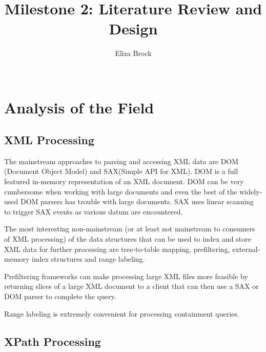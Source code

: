 \documentclass{acm_proc_article-sp}
\begin{document}
\title{Milestone 2: Literature Review and Design}


\author{
\alignauthor 
Eliza Brock \\
       \\
}
\maketitle



\section{Analysis of the Field}
\subsection{XML Processing}
The mainstream approaches to parsing and accessing XML data are DOM (Document Object Model) and SAX(Simple API for XML). DOM is a full featured in-memory representation of an XML document.  DOM can be very cumbersome when working with large documents and even the best of the widely-used DOM parsers has trouble with large documents. SAX  uses linear scanning to trigger SAX events as various datum are encountered.

The most interesting non-mainstream (or at least not mainstream to consumers of XML processing) of the data structures that can be used to index and store XML data for further processing are tree-to-table mapping, prefiltering, external-memory index structures and range labeling.  

Prefiltering frameworks\cite{huang:prefiltering} can make processing large XML files more feasible by returning slices of a large XML document to a client that can then use a SAX or DOM parser to complete the query.  

Range labeling is extremely convenient for processing containment queries\cite{chen:indexing}.





\subsection{XPath Processing}\cite{xpathspec}
\end{document}
